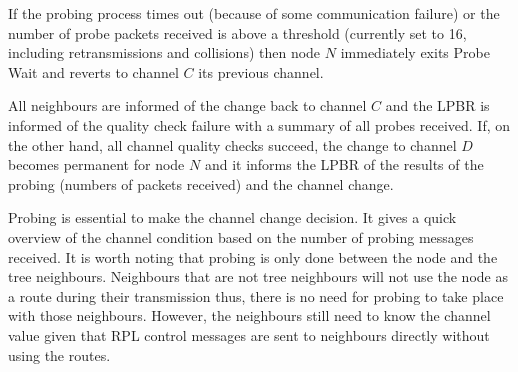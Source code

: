 If the probing process times out (because of some communication failure) or the number of probe packets received is above a threshold (currently set to 16, including retransmissions and collisions) then node $N$ immediately exits Probe Wait and reverts to channel $C$ its previous channel. 


All neighbours are informed of the change back to channel $C$ and the LPBR is informed of the quality check failure with a summary of all probes received.
If, on the other hand, all channel quality checks succeed, the change to channel $D$ becomes permanent for node $N$ and it informs the LPBR of the results of the probing (numbers of packets received) and the channel change.

Probing is essential to make the channel change decision. It gives a quick overview of the channel condition based on the number of probing messages received. It is worth noting that probing is only done between the node and the tree neighbours. Neighbours that are not tree neighbours will not use the node as a route during their transmission thus, there is no need for probing to take place with those neighbours. However, the neighbours still need to know the channel value given that RPL control messages are sent to neighbours directly without using the routes.
